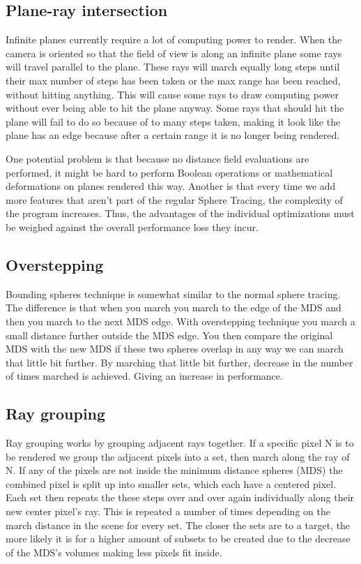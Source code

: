		\subsection{Plane-ray intersection}

			Infinite planes currently require a lot of computing power to
			render. When the camera is oriented so that the field of view is
			along an infinite plane some rays will travel parallel to the
			plane. These rays will march equally long steps until their max
			number of steps has been taken or the max range has been reached, 
			without hitting anything. This will cause some rays to draw 
			computing power without ever being able to hit the plane anyway. 
			Some rays that should hit the plane will fail to do so because of 
			to many steps taken, making it look like the plane has an edge 
			because after a certain range it is no longer being rendered.

			One potential problem is that because no distance field evaluations 
			are performed, it might be hard to perform Boolean operations or 
			mathematical deformations on planes rendered this way. Another is 
			that every time we add more features that aren't part of the 
			regular Sphere Tracing, the complexity of the program increases. 
			Thus, the advantages of the individual optimizations must be 
			weighed against the overall performance loss they incur. 

		\subsection{Overstepping}

			Bounding spheres technique is somewhat similar to the normal sphere
			tracing. The difference is that when you march you march to the
			edge of the MDS and then you march to the next MDS edge. With
			overstepping technique you march a small distance further outside
			the MDS edge. You then compare the original MDS with the new MDS if
			these two spheres overlap in any way we can march that little bit
			further. By marching that little bit further, decrease in the
			number of times marched is achieved. Giving an increase in
			performance. 

		\subsection{Ray grouping}
		
			Ray grouping works by grouping adjacent rays together. If a
			specific pixel N is to be rendered we group the adjacent pixels
			into a set, then march along the ray of N. If any of the pixels are
			not inside the minimum distance spheres (MDS) the combined pixel is
			split up into smaller sets, which each have a centered pixel. Each
			set then repeats the these steps over and over again individually
			along their new center pixel's ray. This is repeated a number of
			times depending on the march distance in the scene for every set.
			The closer the sets are to a target, the more likely it is for a
			higher amount of subsets to be created due to the decrease of the
			MDS's volumes making less pixels fit inside.
			
